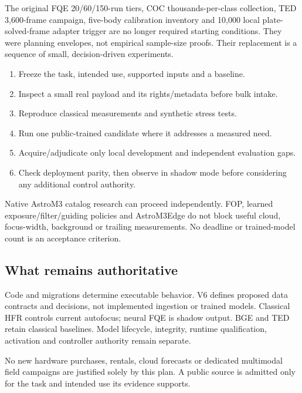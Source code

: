 \documentclass[11pt,a4paper]{article}
\begin{document}
The original FQE 20/60/150-run tiers, COC thousands-per-class collection,
TED 3,600-frame campaign, five-body calibration inventory and 10,000 local
plate-solved-frame adapter trigger are no longer required starting conditions.
They were planning envelopes, not empirical sample-size proofs. Their
replacement is a sequence of small, decision-driven experiments.

\begin{enumerate}
\item Freeze the task, intended use, supported inputs and a baseline.
\item Inspect a small real payload and its rights/metadata before bulk intake.
\item Reproduce classical measurements and synthetic stress tests.
\item Run one public-trained candidate where it addresses a measured need.
\item Acquire/adjudicate only local development and independent evaluation gaps.
\item Check deployment parity, then observe in shadow mode before considering
any additional control authority.
\end{enumerate}

Native AstroM3 catalog research can proceed independently. FOP, learned
exposure/filter/guiding policies and AstroM3Edge do not block useful cloud,
focus-width, background or trailing measurements. No deadline or trained-model
count is an acceptance criterion.

\subsection{What remains authoritative}
Code and migrations determine executable behavior. V6 defines proposed data
contracts and decisions, not implemented ingestion or trained models. Classical
HFR controls current autofocus; neural FQE is shadow output. BGE and TED retain
classical baselines. Model lifecycle, integrity, runtime qualification,
activation and controller authority remain separate.

No new hardware purchases, rentals, cloud forecasts or dedicated multimodal
field campaigns are justified solely by this plan. A public source is admitted
only for the task and intended use its evidence supports.
\end{document}
